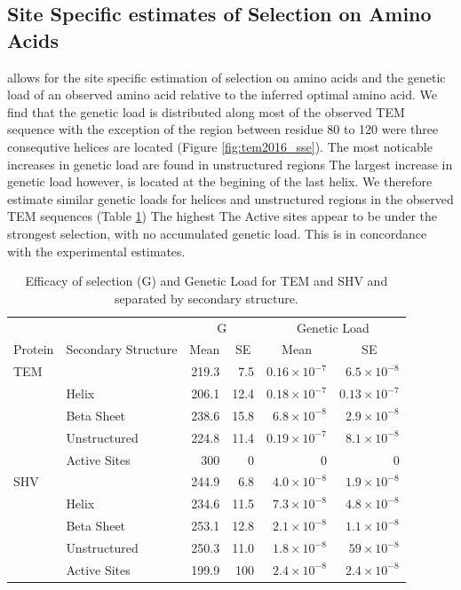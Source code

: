 \documentclass[12pt]{article}
\begin{document}
\subsection*{Site Specific estimates of Selection on Amino Acids}
\selac allows for the site specific estimation of selection on amino acids and the genetic load of an observed amino acid relative to the inferred optimal amino acid.
We find that the genetic load is distributed along most of the observed TEM sequence with the exception of the region between residue 80 to 120 were three consequtive helices are located (Figure \ref{fig:tem2016_sse}). 
The most noticable increases in genetic load are found in unstructured regions
The largest increase in genetic load however, is located at the begining of the last helix.
We therefore estimate similar genetic loads for helices and unstructured regions in the observed TEM sequences (Table \ref{tab:selection})
The highest 
The Active sites appear to be under the strongest selection, with no accumulated genetic load.
This is in concordance with the experimental estimates.

\begin{table}
  \centering
  \begin{tabular}{llrrrr}
    & & \multicolumn{2}{c}{G} & \multicolumn{2}{c}{Genetic Load} \\ 
    Protein & Secondary Structure	& \multicolumn{1}{c}{Mean} & \multicolumn{1}{c}{SE} & \multicolumn{1}{c}{Mean} & \multicolumn{1}{c}{SE} \\ \hline 
    TEM	&		& 219.3 & 7.5 & $0.16\times10^{-7}$ & $6.5\times10^{-8}$ \\
    &Helix 		& 206.1 & 12.4 & $0.18\times10^{-7}$ & $0.13\times10^{-7}$ \\
    &Beta Sheet 	& 238.6 & 15.8 & $6.8\times10^{-8}$ & $2.9\times10^{-8}$ \\
    &Unstructured 	& 224.8 & 11.4 & $0.19\times10^{-7}$ & $8.1\times10^{-8}$ \\
    &Active Sites 	& 300   & 0    & 0      & 0      \\ \hline
    
    SHV&		& 244.9 & 6.8  & $4.0\times10^{-8}$ & $1.9\times10^{-8}$ \\
    &Helix		& 234.6 & 11.5 & $7.3\times10^{-8}$ & $4.8\times10^{-8}$ \\
    &Beta Sheet 	& 253.1 & 12.8 & $2.1\times10^{-8}$ & $1.1\times10^{-8}$ \\
    &Unstructured	& 250.3 & 11.0 & $1.8\times10^{-8}$ & $59\times10^{-8}$  \\
    &Active Sites	& 199.9 & 100  & $2.4\times10^{-8}$ & $2.4\times10^{-8}$ \\

  \end{tabular}
  \caption{Efficacy of selection (G) and Genetic Load for TEM and SHV and separated by secondary structure.}
  \label{tab:selection}
\end{table}
\end{document}
